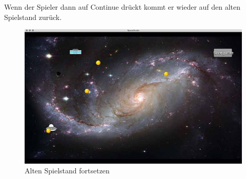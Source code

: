 \documentclass[12pt]{article}
\begin{document}
\clearpage
Wenn der Spieler dann auf Continue drückt kommt er wieder auf den alten Spielstand zurück.
\begin{figure}[htp]
	\centering
	\includegraphics[scale=0.6]{TestProtocolBilder/continueScreen@0,25x.jpg}
	\caption{Alten Spielstand fortsetzen}
\end{figure}

\newpage
\end{document}
